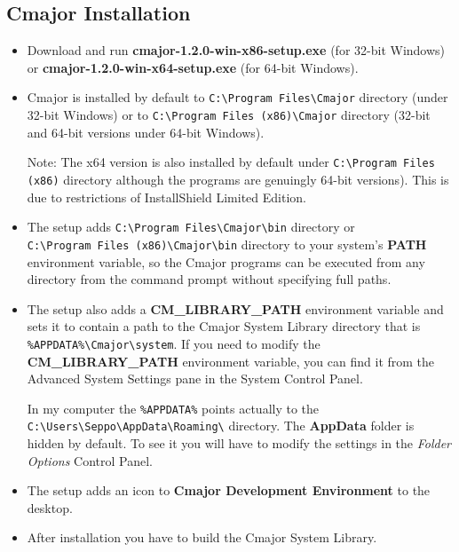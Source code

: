 \documentclass[oneside, a4paper, 11pt]{article}
\begin{document}
\subsection{Cmajor Installation}

\begin{itemize}

\item
Download and run \textbf{cmajor-1.2.0-win-x86-setup.exe} (for 32-bit Windows) or
\textbf{cmajor-1.2.0-win-x64-setup.exe} (for 64-bit Windows).

\item
Cmajor is installed by default to \verb|C:\Program Files\Cmajor| directory (under 32-bit Windows) or
to \verb|C:\Program Files (x86)\Cmajor| directory (32-bit and 64-bit versions under 64-bit Windows).

Note: The x64 version is also installed by default under
\verb|C:\Program Files (x86)| directory although the programs are genuingly 64-bit versions).
This is due to restrictions of InstallShield Limited Edition.

\item
The setup adds \verb|C:\Program Files\Cmajor\bin| directory or \\
\verb|C:\Program Files (x86)\Cmajor\bin| directory
to your system's \textbf{PATH} environment variable, so the Cmajor programs can be executed from any
directory from the command prompt without specifying full paths.

\item
The setup also adds a \textbf{CM\_LIBRARY\_PATH} environment variable and
sets it to contain a path to the Cmajor System Library directory
that is \verb|%APPDATA%\Cmajor\system|. If you need to modify the
\textbf{CM\_LIBRARY\_PATH} environment variable, you can find it from the Advanced System Settings pane in the System Control Panel.

In my computer the \verb|%APPDATA%| points actually to the
\verb|C:\Users\Seppo\AppData\Roaming\| directory. The \textbf{AppData} folder
is hidden by default. To see it you will have to modify the settings in
the \emph{Folder Options} Control Panel.

\item
The setup adds an icon to \textbf{Cmajor Development Environment} to the desktop.

\item
After installation you have to build the Cmajor System Library.

\end{itemize}
\end{document}
